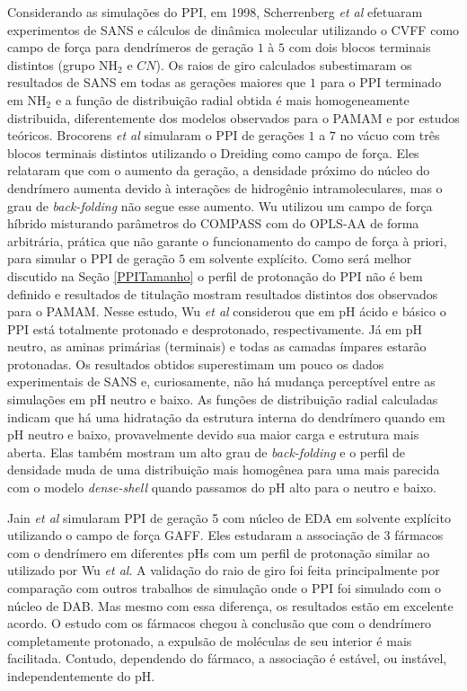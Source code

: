 Considerando as simulações do PPI,
em 1998, Scherrenberg \textit{et al}\cite{Scherrenberg1998} efetuaram experimentos de SANS e cálculos de dinâmica molecular utilizando o CVFF\cite{Lifson1979} como campo de força para dendrímeros de geração $1$ à $5$ com dois blocos terminais distintos (grupo NH$_2$ e $CN$).
Os raios de giro calculados subestimaram os resultados de SANS em todas as gerações maiores que $1$ para o PPI terminado em NH$_2$ e a função de distribuição radial obtida é mais homogeneamente distribuida, diferentemente dos modelos observados para o PAMAM e por estudos teóricos.
Brocorens \textit{et al}\cite{Brocorens2005} simularam o PPI de gerações $1$ a $7$ no vácuo com três blocos terminais distintos utilizando o Dreiding\cite{Mayo1990} como campo de força.
Eles relataram que com o aumento da geração, a densidade próximo do núcleo do dendrímero aumenta devido à interações de hidrogênio intramoleculares, mas o grau de \textit{back-folding} não segue esse aumento.
Wu\cite{Wu2010} utilizou um campo de força híbrido misturando parâmetros do COMPASS\cite{Sun1998} com do OPLS-AA\cite{Jorgensen1996} de forma arbitrária, prática que não garante o funcionamento do campo de força à priori, para simular o PPI de geração $5$ em solvente explícito.
Como será melhor discutido na Seção \ref{PPITamanho} o perfil de protonação do PPI não é bem definido e resultados de titulação mostram resultados distintos dos observados para o PAMAM.
Nesse estudo, Wu \textit{et al} considerou que em pH ácido e básico o PPI está totalmente protonado e desprotonado, respectivamente.
Já em pH neutro, as aminas primárias (terminais) e todas as camadas ímpares estarão protonadas.
Os resultados obtidos superestimam um pouco os dados experimentais de SANS e, curiosamente, não há mudança perceptível entre as simulações em pH neutro e baixo.
As funções de distribuição radial calculadas indicam que há uma hidratação da estrutura interna do dendrímero quando em pH neutro e baixo, provavelmente devido sua maior carga e estrutura mais aberta.
Elas também mostram um alto grau de \textit{back-folding} e o perfil de densidade muda de uma distribuição mais homogênea para uma mais parecida com o modelo \textit{dense-shell} quando passamos do pH alto para o neutro e baixo.

Jain \textit{et al}\cite{Jain2013} simularam PPI de geração 5 com núcleo de EDA em solvente explícito utilizando o campo de força GAFF\cite{Wang2004}.
Eles estudaram a associação de 3 fármacos com o dendrímero em diferentes pHs com um perfil de protonação similar ao utilizado por Wu \textit{et al}\cite{Wu2010}.
A validação do raio de giro foi feita principalmente por comparação com outros trabalhos de simulação onde o PPI foi simulado com o núcleo de DAB.
Mas mesmo com essa diferença, os resultados estão em excelente acordo.
O estudo com os fármacos chegou à conclusão que com o dendrímero completamente protonado, a expulsão de moléculas de seu interior é mais facilitada. 
Contudo, dependendo do fármaco, a associação é estável, ou instável, independentemente do pH.

